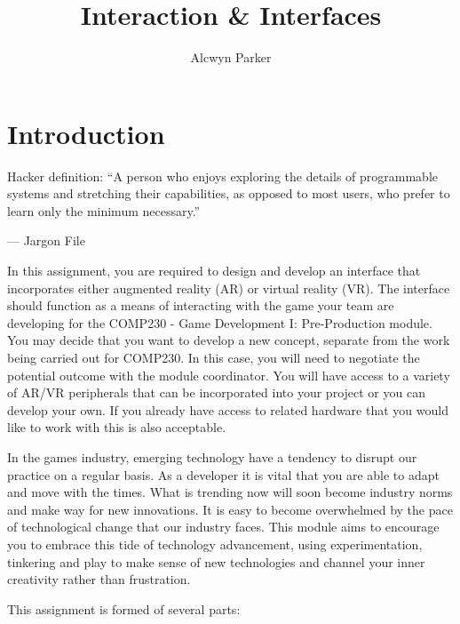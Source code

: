 \documentclass{../../fal_assignment}
\title{Interaction \& Interfaces}
\author{Alcwyn Parker}
\begin{document}
\maketitle

\section*{Introduction}

\begin{marginquote}
Hacker definition: ``A person who enjoys exploring the details of programmable systems and stretching their capabilities, as opposed to most users, who prefer to learn only the minimum necessary.''

--- Jargon File

\end{marginquote}

In this assignment, you are required to design and develop an interface that incorporates either augmented reality (AR) or virtual reality (VR). The interface should function as a means of interacting with the game your team are developing for the COMP230 - Game Development I: Pre-Production module. You may decide that you want to develop a new concept, separate from the work being carried out for COMP230. In this case, you will need to negotiate the potential outcome with the module coordinator. You will have access to a variety of AR/VR peripherals that can be incorporated into your project or you can develop your own. If you already have access to related hardware that you would like to work with this is also acceptable. 

In the games industry, emerging technology have a tendency to disrupt our practice on a regular basis. As a developer it is vital that you are able to adapt and move with the times. What is trending now will soon become industry norms and make way for new innovations. It is easy to become overwhelmed by the pace of technological change that our industry faces. This module aims to encourage you to embrace this tide of technology advancement, using experimentation, tinkering and play to make sense of new technologies and channel your inner creativity rather than frustration. 

This assignment is formed of several parts:
\end{document}
